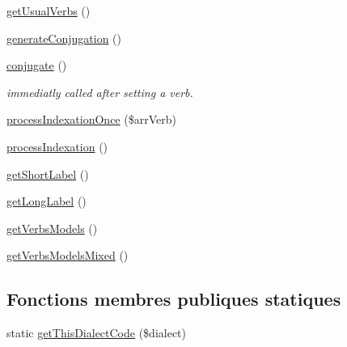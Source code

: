 \begin{DoxyCompactItemize}
\item 
\hyperlink{class_conjugation_manager_base_a1dff05e951fe4453247a97f5aff5bc83}{get\+Usual\+Verbs} ()
\item 
\hyperlink{class_conjugation_manager_base_aa4e4c35d0affaf806ee807878a507b3e}{generate\+Conjugation} ()
\item 
\hyperlink{class_conjugation_manager_base_a20e28aa17935e10b1a763b39a3c4fdf3}{conjugate} ()
\begin{DoxyCompactList}\small\item\em immediatly called after setting a verb. \end{DoxyCompactList}\item 
\hyperlink{class_conjugation_manager_base_ad8091fd5ac8eb3c036de220ec6932234}{process\+Indexation\+Once} (\$arr\+Verb)
\item 
\hyperlink{class_conjugation_manager_base_aa8df6ff754ed94b8771aebff95e6e3fe}{process\+Indexation} ()
\item 
\hyperlink{class_conjugation_manager_base_ababdfdc7a62b48362bcdfa38aed647d5}{get\+Short\+Label} ()
\item 
\hyperlink{class_conjugation_manager_base_adc1333ad8b45b63d63424c2b6754e8f5}{get\+Long\+Label} ()
\item 
\hyperlink{class_conjugation_manager_base_ac7e4846ef7b60545bb2b4d77f6bf7f0f}{get\+Verbs\+Models} ()
\item 
\hyperlink{class_conjugation_manager_base_a87ceb2a9767830108d01928c19a90f83}{get\+Verbs\+Models\+Mixed} ()
\end{DoxyCompactItemize}
\subsection*{Fonctions membres publiques statiques}
\begin{DoxyCompactItemize}
\item 
static \hyperlink{class_conjugation_manager_base_a0249bf3a9b7eb739e074bac74c436cdc}{get\+This\+Dialect\+Code} (\$dialect)
\end{DoxyCompactItemize}
